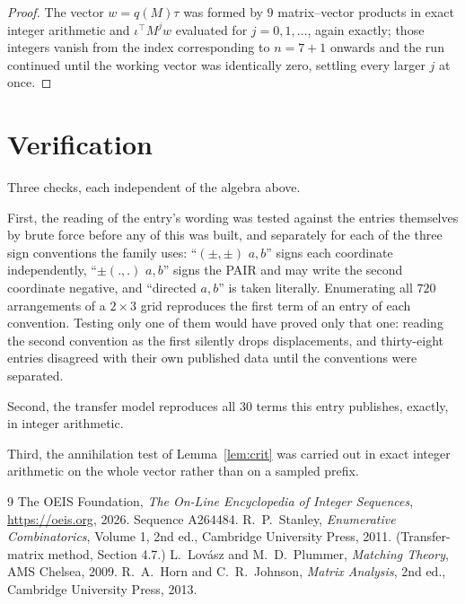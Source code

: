 \documentclass[11pt,a4paper]{article}
\theoremstyle{plain}
\theoremstyle{definition}
\begin{document}
\begin{proof}
The vector $w=q(M)\tau$ was formed by $9$ matrix--vector products in exact integer
arithmetic and $\iota^{\!\top}M^{j}w$ evaluated for $j=0,1,\dots$, again exactly; those
integers vanish from the index corresponding to $n=7+1$ onwards and the run continued
until the working vector was identically zero, settling every larger $j$ at once.
\end{proof}

\section{Verification}

Three checks, each independent of the algebra above.

First, the reading of the entry's wording was tested against the entries themselves by brute
force before any of this was built, and separately for each of the three sign conventions the
family uses: ``$(\pm,\pm)$ $a,b$'' signs each coordinate independently, ``$\pm(.,.)$ $a,b$''
signs the PAIR and may write the second coordinate negative, and ``directed $a,b$'' is taken
literally. Enumerating all $720$ arrangements of a $2\times3$ grid reproduces the first term
of an entry of each convention. Testing only one of them would have proved only that one:
reading the second convention as the first silently drops displacements, and thirty-eight
entries disagreed with their own published data until the conventions were separated.

Second, the transfer model reproduces all $30$ terms this entry publishes, exactly, in
integer arithmetic.

Third, the annihilation test of Lemma~\ref{lem:crit} was carried out in exact integer
arithmetic on the whole vector rather than on a sampled prefix.

\begin{thebibliography}{9}
 The OEIS Foundation, \emph{The On-Line Encyclopedia of Integer
Sequences}, \url{https://oeis.org}, 2026. Sequence A264484.
 R.~P.~Stanley, \emph{Enumerative Combinatorics}, Volume 1, 2nd ed.,
Cambridge University Press, 2011. (Transfer-matrix method, Section 4.7.)
 L.~Lov\'asz and M.~D.~Plummer, \emph{Matching Theory}, AMS Chelsea, 2009.
 R.~A.~Horn and C.~R.~Johnson, \emph{Matrix Analysis}, 2nd ed., Cambridge
University Press, 2013.
\end{thebibliography}
\end{document}
